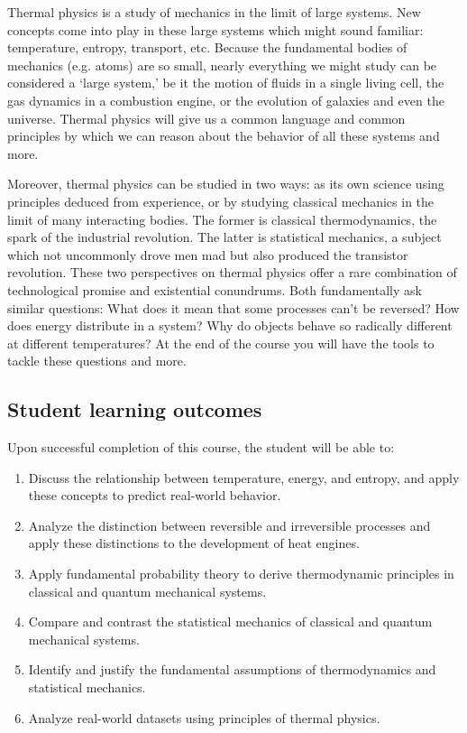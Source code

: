 \documentclass{syllabus}
\begin{document}
Thermal physics is a study of mechanics in the limit of large systems. New concepts come into play in these large systems which might sound familiar: temperature, entropy, transport, etc. Because the fundamental bodies of mechanics (e.g. atoms) are so small, nearly everything we might study can be considered a ‘large system,’ be it the motion of fluids in a single living cell, the gas dynamics in a combustion engine, or the evolution of galaxies and even the universe. Thermal physics will give us a common language and common principles by which we can reason about the behavior of all these systems and more.

Moreover, thermal physics can be studied in two ways: as its own science using principles deduced from experience, or by studying classical mechanics in the limit of many interacting bodies. The former is classical thermodynamics, the spark of the industrial revolution. The latter is statistical mechanics, a subject which not uncommonly drove men mad but also produced the transistor revolution. These two perspectives on thermal physics offer a rare combination of technological promise and existential conundrums. Both fundamentally ask similar questions: What does it mean that some processes can’t be reversed? How does energy distribute in a system? Why do objects behave so radically different at different temperatures? At the end of the course you will have the tools to tackle these questions and more.
\clearpage

\subsection*{Student learning outcomes} 

\noindent
Upon successful completion of this course, the student will be able to:
\begin{enumerate}[label=\textcolor{CarthageDark}{\bfseries\arabic*.}]
    \item Discuss the relationship between temperature, energy, and entropy, and apply these concepts to predict real-world behavior. 
    \item Analyze the distinction between reversible and irreversible processes and apply these distinctions to the development of heat engines.
    \item Apply fundamental probability theory to derive thermodynamic principles in classical and quantum mechanical systems.
    \item Compare and contrast the statistical mechanics of classical and quantum mechanical systems.
    \item Identify and justify the fundamental assumptions of thermodynamics and statistical mechanics.
    \item Analyze real-world datasets using principles of thermal physics.
\end{enumerate}
\end{document}
